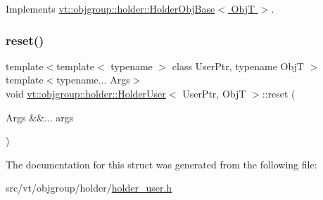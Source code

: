 Implements \hyperlink{structvt_1_1objgroup_1_1holder_1_1_holder_obj_base_a4b350b0126259d31a62fd426a08f6698}{vt\+::objgroup\+::holder\+::\+Holder\+Obj\+Base$<$ Obj\+T $>$}.

\mbox{\label{structvt_1_1objgroup_1_1holder_1_1_holder_user_a4a43e5b38a0474cd523ccd9aa66950e9}} 
\subsubsection{\texorpdfstring{reset()}{reset()}}
{\footnotesize\ttfamily template$<$template$<$ typename $>$ class User\+Ptr, typename ObjT $>$ \\
template$<$typename... Args$>$ \\
void \hyperlink{structvt_1_1objgroup_1_1holder_1_1_holder_user}{vt\+::objgroup\+::holder\+::\+Holder\+User}$<$ User\+Ptr, ObjT $>$\+::reset (\begin{DoxyParamCaption}\item[{Args \&\&...}]{args }\end{DoxyParamCaption})\hspace{0.3cm}{\ttfamily [inline]}}



The documentation for this struct was generated from the following file\+:\begin{DoxyCompactItemize}
\item 
src/vt/objgroup/holder/\hyperlink{holder__user_8h}{holder\+\_\+user.\+h}\end{DoxyCompactItemize}
